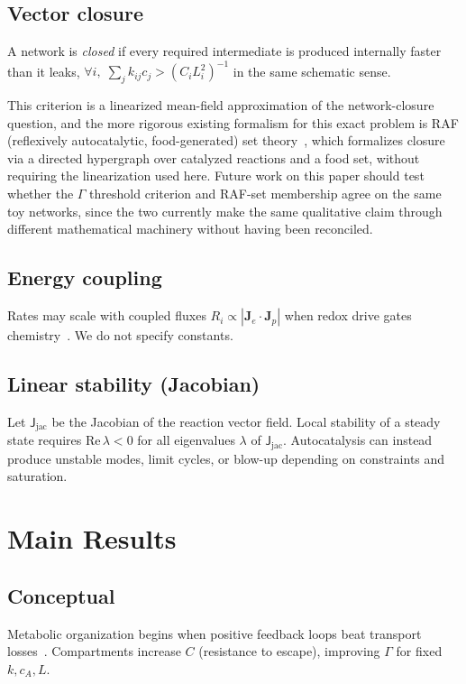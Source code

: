 \documentclass[11pt,a4paper]{article}
\begin{document}
\subsection{Vector closure}
A network is \emph{closed} if every required intermediate is produced internally faster than it leaks, $\forall i,\; \sum_j k_{ij}c_j > (C_i L_i^2)^{-1}$ in the same schematic sense.

This criterion is a linearized mean-field approximation of the network-closure question, and the more rigorous existing formalism for this exact problem is RAF (reflexively autocatalytic, food-generated) set theory~\cite{HordijkSteel2004}, which formalizes closure via a directed hypergraph over catalyzed reactions and a food set, without requiring the linearization used here. Future work on this paper should test whether the $\Gamma$ threshold criterion and RAF-set membership agree on the same toy networks, since the two currently make the same qualitative claim through different mathematical machinery without having been reconciled.

\subsection{Energy coupling}
Rates may scale with coupled fluxes $R_i\propto |\bm{J}_e\cdot\bm{J}_p|$ when redox drive gates chemistry~\cite{Lane2010}. We do not specify constants.

\subsection{Linear stability (Jacobian)}
Let $\mathsf{J}_{\mathrm{jac}}$ be the Jacobian of the reaction vector field. Local stability of a steady state requires $\mathrm{Re}\,\lambda<0$ for all eigenvalues $\lambda$ of $\mathsf{J}_{\mathrm{jac}}$. Autocatalysis can instead produce unstable modes, limit cycles, or blow-up depending on constraints and saturation.

\section{Main Results}

\subsection{Conceptual}
Metabolic organization begins when positive feedback loops beat transport losses~\cite{MaynardSmith1997}. Compartments increase $C$ (resistance to escape), improving $\Gamma$ for fixed $k,c_A,L$.
\end{document}
